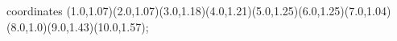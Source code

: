 					coordinates { (1.0,1.07)(2.0,1.07)(3.0,1.18)(4.0,1.21)(5.0,1.25)(6.0,1.25)(7.0,1.04)(8.0,1.0)(9.0,1.43)(10.0,1.57)};